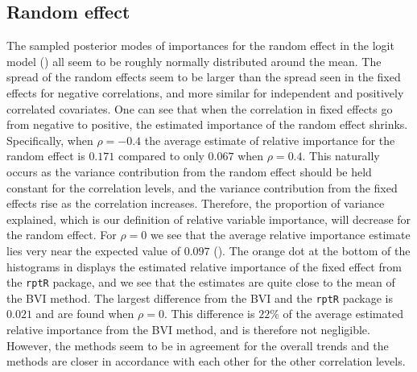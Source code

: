 \subsection{Random effect}
The sampled posterior modes of importances for the random effect in the logit model () all seem to be roughly normally distributed around the mean. The spread of the random effects seem to be larger than the spread seen in the fixed effects for negative correlations, and more similar for independent and positively correlated covariates. One can see that when the correlation in fixed effects go from negative to positive, the estimated importance of the random effect shrinks. Specifically, when $\rho=-0.4$ the average estimate of relative importance for the random effect is $0.171$ compared to only $0.067$ when $\rho=0.4$. This naturally occurs as the variance contribution from the random effect should be held constant for the correlation levels, and the variance contribution from the fixed effects rise as the correlation increases. Therefore, the proportion of variance explained, which is our definition of relative variable importance, will decrease for the random effect. For $\rho=0$ we see that the average relative importance estimate lies very near the expected value of $0.097$ (). The orange dot at the bottom of the histograms in  displays the estimated relative importance of the fixed effect from the \texttt{rptR} package, and we see that the estimates are quite close to the mean of the BVI method. The largest difference from the BVI and the \texttt{rptR} package is $0.021$ and are found when $\rho=0$. This difference is $22\%$ of the average estimated relative importance from the BVI method, and is therefore not negligible. However, the methods seem to be in agreement for the overall trends and the methods are closer in accordance with each other for the other correlation levels.
\\
\\
